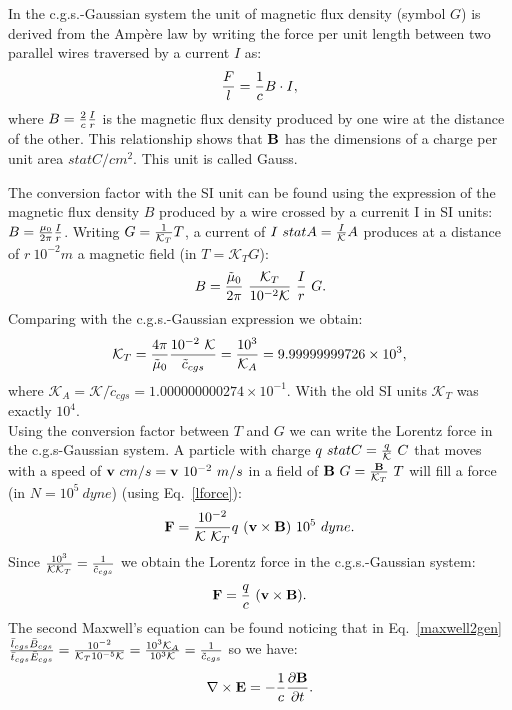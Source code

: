 \documentclass[12pt,a4paper]{article}
\def\kappaa{1.000000000274\times 10^{-1}}
\def\toverg{9.99999999726\times 10^{3}}
\begin{document}
{\color{orange} In the c.g.s.-Gaussian system the unit of magnetic
flux density (symbol $G$) is derived from the Amp\`ere law by writing 
the force per unit length between two parallel wires traversed by 
a current $I$ as:
\begin{equation}
{F \over l} = {1\over c} B \cdot I,
\end{equation}
where $B={2\over c} {I \over r}$ is the magnetic flux density produced by 
one wire at the distance of the other. 
This relationship shows that ${\bf B}$ has the dimensions of a
charge per unit area $statC/cm^2$. This unit is called Gauss.

The conversion factor with the SI unit can be found using the expression of 
the magnetic flux density $B$ produced by a wire crossed by 
a currenit I in SI units: $B={\mu_0\over 2 \pi} {I \over r}$. 
Writing $G={1\over \mathcal{K}_T} T$, a current of $I\ statA= {I\over \mathcal{K}} 
A$ produces at a distance of $r\ {10^{-2}} m$ a magnetic field 
(in $T=\mathcal{K}_T G$): 
\begin{equation}
B={\tilde \mu_0\over 2 \pi}\ {\mathcal{K}_T \over
10^{-2} \mathcal{K}}\ {I\over r}\  G.
\end{equation}
Comparing with the c.g.s.-Gaussian expression we obtain:
\begin{equation}
\mathcal{K}_T= {4 \pi \over \tilde \mu_0} {10^{-2}\ \mathcal{K} \over \tilde c_{cgs}}= 
{10^3 \over \mathcal{K}_A}=\toverg,
\end{equation}
where $\mathcal{K}_A=\mathcal{K}/\tilde c_{cgs}=\kappaa$. 
With the old SI units $\mathcal{K}_T$ was exactly $10^4$.
\\
Using the conversion factor between $T$ and $G$ we can write the 
Lorentz force in the c.g.s-Gaussian system. A particle with charge
$q\ statC={q\over \mathcal{K}}\ C$ that moves with a speed of ${\bf v}\ cm/s=
{\bf v}\ 10^{-2}\ m/s$ in a field of ${\bf B}\ G = {{\bf B} \over \mathcal{K}_T}\ T$ 
will fill a force (in $N=10^5\ dyne$) (using Eq.~\ref{lforce}):
\begin{equation}
{\bf F}={10^{-2} \over \mathcal{K}\ \mathcal{K}_T} q\ ({\bf v}\times {\bf B})\ 10^5\ dyne. 
\end{equation}
Since ${10^{3} \over \mathcal{K} \mathcal{K}_T}=
{1\over \tilde c_{cgs}}$ we obtain the Lorentz force in the 
c.g.s.-Gaussian system:
\begin{equation}
{\bf F}={q\over c}\ ({\bf v}\times {\bf B}).
\end{equation}
The second Maxwell's equation can be found noticing that 
in Eq.~\ref{maxwell2gen}
${\bar l_{cgs} \bar B_{cgs} \over \bar t_{cgs} \bar E_{cgs}}=
{10^{-2} \over \mathcal{K}_T 10^{-5} \mathcal{K}}={10^3 \mathcal{K}_A \over 10^3 \mathcal{K}}={1\over 
\tilde c_{cgs}}$ so we have:
\begin{equation}
\nabla \times {\bf E}=-{1\over c}
{\partial {\bf B} \over \partial t}.
\label{maxwell2cgs}
\end{equation}
}
\\
\end{document}
